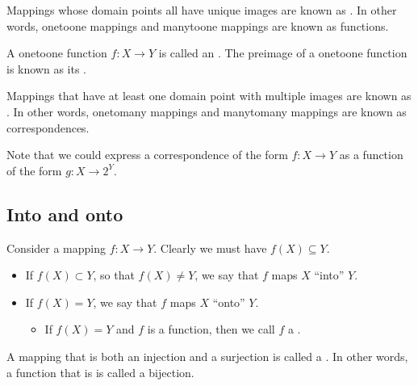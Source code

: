 \documentclass[letterpaper,10pt,english]{jupyterBook}
\begin{document}
\sphinxAtStartPar
Mappings whose domain points all have unique images are known as
. In other words, one\sphinxhyphen{}to\sphinxhyphen{}one mappings and many\sphinxhyphen{}to\sphinxhyphen{}one mappings are
known as functions.

\sphinxAtStartPar
A one\sphinxhyphen{}to\sphinxhyphen{}one function \(f: X \rightarrow Y\) is called an . The pre\sphinxhyphen{}image of a one\sphinxhyphen{}to\sphinxhyphen{}one function is known as its .

\sphinxAtStartPar
Mappings that have at least one domain point with multiple images are known as . In other words, one\sphinxhyphen{}to\sphinxhyphen{}many mappings and many\sphinxhyphen{}to\sphinxhyphen{}many mappings are known as correspondences.

\sphinxAtStartPar
Note that we could express a correspondence of the form \(f : X \rightarrow Y\) as a function of the form \(g: X \rightarrow 2^Y\).


\subsection{Into and onto}
\label{\detokenize{03.mappings_functions_correspondences:into-and-onto}}
\sphinxAtStartPar
Consider a mapping \(f : X \rightarrow Y\). Clearly we must have \(f(X) \subseteq Y\).
\begin{itemize}
\item {} 
\sphinxAtStartPar
If \(f(X ) \subset Y\), so that \(f(X) \ne Y\), we say that \(f\) maps \(X\) “into” \(Y\).

\item {} 
\sphinxAtStartPar
If \(f(X) = Y\), we say that \(f\) maps \(X\) “onto” \(Y\).
\begin{itemize}
\item {} 
\sphinxAtStartPar
If \(f(X) = Y\) and \(f\) is a function, then we call \(f\) a .

\end{itemize}

\end{itemize}

\sphinxAtStartPar
A mapping that is both an injection and a surjection is called a . In other words, a function that is  is called a
bijection.
\end{document}
